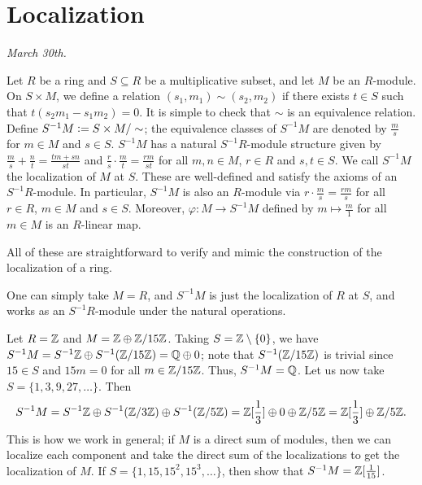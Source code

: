 \section{Localization}
\textit{March 30th.}

\begin{definition}
    Let $R$ be a ring and $S \subseteq R$ be a multiplicative subset, and let $M$ be an $R$-module. On $S \times M$, we define a relation $(s_{1},m_{1}) \sim (s_{2},m_{2})$ if there exists $t \in S$ such that $t(s_{2}m_{1} - s_{1}m_{2}) = 0$. It is simple to check that $\sim$ is an equivalence relation. Define $S^{-1}M \vcentcolon= S \times M/\sim$; the equivalence classes of $S^{-1}M$ are denoted by $\frac{m}{s}$ for $m \in M$ and $s \in S$. $S^{-1}M$ has a natural $S^{-1}R$-module structure given by $\frac{m}{s} + \frac{n}{t} = \frac{tm + sn}{st}$ and $\frac{r}{s} \cdot \frac{m}{t} = \frac{rm}{st}$ for all $m,n \in M$, $r \in R$ and $s,t \in S$. We call $S^{-1}M$ the localization of $M$ at $S$. These are well-defined and satisfy the axioms of an $S^{-1}R$-module. In particular, $S^{-1}M$ is also an $R$-module via $r \cdot \frac{m}{s} = \frac{rm}{s}$ for all $r \in R$, $m \in M$ and $s \in S$. Moreover, $\varphi:M \to S^{-1}M$ defined by $m \mapsto \frac{m}{1}$ for all $m \in M$ is an $R$-linear map.
\end{definition}

All of these are straightforward to verify and mimic the construction of the localization of a ring. 

\begin{example}
    One can simply take $M = R$, and $S^{-1}M$ is just the localization of $R$ at $S$, and works as an $S^{-1}R$-module under the natural operations.
\end{example}

\begin{example}
    Let $R = \mathbb{Z}$ and $M = \mathbb{Z} \oplus \mathbb{Z}/15\mathbb{Z}$. Taking $S = \mathbb{Z} \setminus \{0\}$, we have $S^{-1}M = S^{-1}\mathbb{Z} \oplus S^{-1}(\mathbb{Z}/15\mathbb{Z}) = \mathbb{Q} \oplus 0$; note that $S^{-1}(\mathbb{Z}/15\mathbb{Z})$ is trivial since $15 \in S$ and $15m = 0$ for all $m \in \mathbb{Z}/15\mathbb{Z}$. Thus, $S^{-1}M = \mathbb{Q}$. Let us now take $S = \{1,3,9,27,\ldots\}$. Then
    \begin{align}
        S^{-1}M = S^{-1}\mathbb{Z} \oplus S^{-1}(\mathbb{Z}/3\mathbb{Z}) \oplus S^{-1}(\mathbb{Z}/5\mathbb{Z}) = \mathbb{Z}[\frac{1}{3}] \oplus 0 \oplus \mathbb{Z}/5\mathbb{Z} = \mathbb{Z}[\frac{1}{3}] \oplus \mathbb{Z}/5\mathbb{Z}. 
    \end{align}
    This is how we work in general; if $M$ is a direct sum of modules, then we can localize each component and take the direct sum of the localizations to get the localization of $M$. If $S = \{1,15,15^{2},15^{3},\ldots\}$, then show that $S^{-1}M = \mathbb{Z}[\frac{1}{15}]$.
\end{example}

